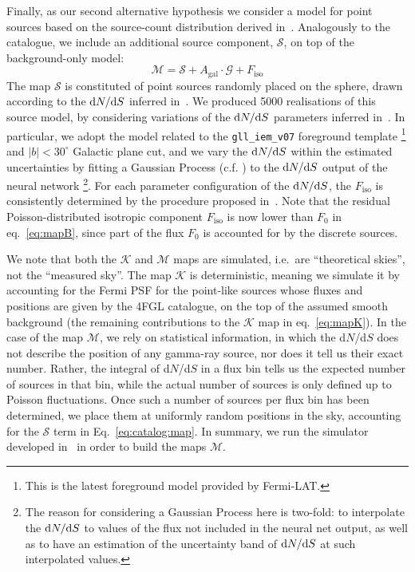 \medskip
Finally,  as our second alternative hypothesis we consider a model for point sources based on the source-count distribution 
derived in~\cite{Amerio:2023uet}.
%
Analogously to the catalogue, we include an additional source component, $\mathcal{S}$, on top of the background-only model:
\begin{equation}
    \mathcal{M} = \mathcal{S} + A_\textrm{gal}\cdot\mathcal{G} + F_\textrm{iso}
    \label{eq:catalog:map}
\end{equation}
The map $\mathcal{S}$ is constituted of point sources randomly placed  on the sphere, drawn according to the $\textrm{d}N/\textrm{d}S$ inferred in~\cite{Amerio:2023uet}. 
We produced 5000 realisations of this source model, by considering variations of the 
$\textrm{d}N/\textrm{d}S$ parameters inferred in~\cite{Amerio:2023uet}. In particular, we adopt the model related to the \verb|gll_iem_v07| foreground template \footnote{This is the latest foreground model provided by Fermi-LAT.} and $|b|<30^\circ$ Galactic plane cut, and we vary the $\textrm{d}N/\textrm{d}S$ within the estimated uncertainties by fitting a Gaussian Process (c.f.  \cite{Rasmussen2005}) to the $\textrm{d}N/\textrm{d}S$  output of the neural network \footnote{The reason for considering a Gaussian Process here is two-fold: to interpolate the $\textrm{d}N/\textrm{d}S$ to values of the flux not included in the neural net output, as well as to have an estimation of the uncertainty band of $\textrm{d}N/\textrm{d}S$ at such interpolated values. }. 
For each parameter configuration of the $\textrm{d}N/\textrm{d}S$, the $F_\textrm{iso}$ is consistently determined by the procedure proposed in~\cite{Amerio:2023uet}.
Note that the residual Poisson-distributed isotropic component $F_\textrm{iso}$  is now lower than  $F_0$ in eq.~\eqref{eq:mapB}, since part of the flux $F_0$ is accounted for by the discrete sources. 

We note that both the $\mathcal{K}$ and $\mathcal{M}$ maps are simulated, i.e.~are ``theoretical skies'', not the ``measured sky''. The map $\mathcal{K}$ is deterministic, meaning we  simulate it by accounting for the Fermi PSF for the point-like sources whose fluxes and positions are given by the 4FGL catalogue, on the top of the assumed smooth background (the remaining contributions to the $\mathcal{K}$ map in eq.~\eqref{eq:mapK}). In the case of the map $\mathcal{M}$, we rely on statistical information, in which the d$N$/d$S$ does not describe the position of any gamma-ray source, nor does it tell us their exact number. Rather, the integral of d$N$/d$S$ in a flux bin tells us the expected number of sources in that bin, while the actual number of sources is only defined up to Poisson fluctuations. Once such a number of sources per flux bin has been determined, we place them at uniformly random positions in the sky, accounting for the $\mathcal{S}$ term in Eq.~\eqref{eq:catalog:map}. In summary, we run the simulator developed in~\cite{Amerio:2023uet} in order to build the maps $\mathcal{M}$.



